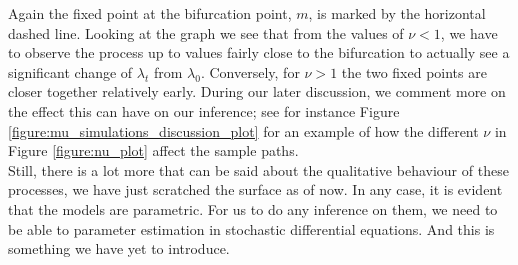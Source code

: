 Again the fixed point at the bifurcation point, $m$, is marked by the horizontal dashed line. Looking at the graph we see that from the values of $\nu < 1$, we have to observe the process up to values fairly close to the bifurcation to actually see a significant change of $\lambda_t$ from $\lambda_0$. Conversely, for $\nu>1$ the two fixed points are closer together relatively early. During our later discussion, we comment more on the effect this can have on our inference; see for instance Figure \ref{figure:mu_simulations_discussion_plot} for an example of how the different $\nu$ in Figure \ref{figure:nu_plot} affect the sample paths. \\
Still, there is a lot more that can be said about the qualitative behaviour of these processes, we have just scratched the surface as of now. In any case, it is evident that the models are parametric. For us to do any inference on them, we need to be able to parameter estimation in stochastic differential equations. And this is something we have yet to introduce.
